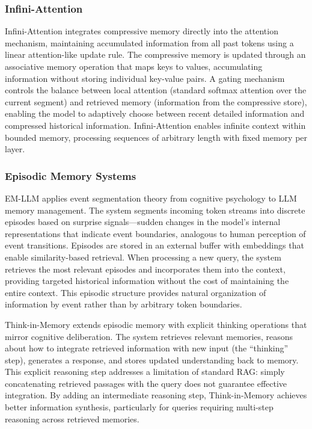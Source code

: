 \documentclass[11pt,letterpaper]{article}
\begin{document}
\subsubsection{Infini-Attention}

Infini-Attention \cite{munkhdalai2024leave} integrates compressive memory directly into the attention mechanism, maintaining accumulated information from all past tokens using a linear attention-like update rule. The compressive memory is updated through an associative memory operation that maps keys to values, accumulating information without storing individual key-value pairs. A gating mechanism controls the balance between local attention (standard softmax attention over the current segment) and retrieved memory (information from the compressive store), enabling the model to adaptively choose between recent detailed information and compressed historical information. Infini-Attention enables infinite context within bounded memory, processing sequences of arbitrary length with fixed memory per layer.

\subsubsection{Episodic Memory Systems}

EM-LLM \cite{hu2025emllm} applies event segmentation theory from cognitive psychology to LLM memory management. The system segments incoming token streams into discrete episodes based on surprise signals---sudden changes in the model's internal representations that indicate event boundaries, analogous to human perception of event transitions. Episodes are stored in an external buffer with embeddings that enable similarity-based retrieval. When processing a new query, the system retrieves the most relevant episodes and incorporates them into the context, providing targeted historical information without the cost of maintaining the entire context. This episodic structure provides natural organization of information by event rather than by arbitrary token boundaries.

Think-in-Memory \cite{liu2023thinkinmemory} extends episodic memory with explicit thinking operations that mirror cognitive deliberation. The system retrieves relevant memories, reasons about how to integrate retrieved information with new input (the ``thinking'' step), generates a response, and stores updated understanding back to memory. This explicit reasoning step addresses a limitation of standard RAG: simply concatenating retrieved passages with the query does not guarantee effective integration. By adding an intermediate reasoning step, Think-in-Memory achieves better information synthesis, particularly for queries requiring multi-step reasoning across retrieved memories.
\end{document}
